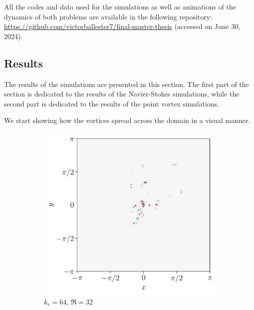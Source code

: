 \documentclass[../main.tex]{subfiles}
\begin{document}
All the codes and data used for the simulations as well as animations of the dynamics of both problems are available in the following repository: \url{https://github.com/victorballester7/final-master-thesis} (accessed on June 30, 2024).

\subsection{Results}\label{sec:results}
The results of the simulations are presented in this section. The first part of the section is dedicated to the results of the Navier-Stokes simulations, while the second part is dedicated to the results of the point vortex simulations.

We start showing how the vortices spread across the domain in a visual manner.
\begin{figure}[ht]
	\centering
	\begin{subfigure}{0.44\textwidth}
		\centering
		\includegraphics[width=\textwidth]{images/domainRe32kdn64.pdf}
		\caption{$k_r = 64$, $\Re = 32$}
	\end{subfigure}\hspace{0.04\textwidth}
	\begin{subfigure}{0.44\textwidth}
		\centering

\end{subfigure}
\end{figure}
\end{document}

